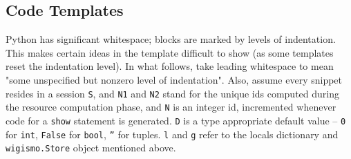 \documentclass{WigReport}
\begin{document}
\subsection{Code Templates}
Python has significant whitespace; blocks are marked by levels of
indentation. This makes certain ideas in the template difficult to show
(as some templates reset the indentation level). In what follows, take
leading whitespace to mean "some unspecified but nonzero level of
indentation". Also, assume every snippet resides in a session {\tt S},
and {\tt N1} and {\tt N2} stand for the unique ids computed during the
resource computation phase, and {\tt N} is an integer id, incremented
whenever code for a {\tt show} statement is generated. {\tt D} is a type
appropriate default value -- {\tt 0} for {\tt int}, {\tt False} for
{\tt bool}, {\tt ''} for tuples. {\tt l} and {\tt g} refer to the locals
dictionary and {\tt wigismo.Store} object mentioned above.
\end{document}
